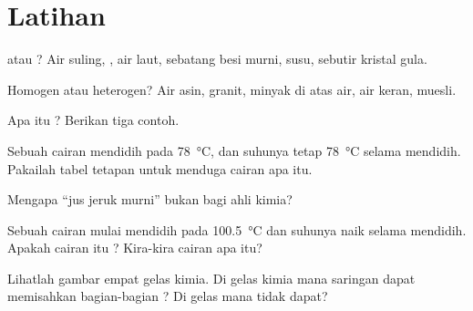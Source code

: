 \section{Latihan}

\begin{exercise}[$\star$]\label{exo:g6:pure-substances-and-mixtures:1}
 atau ? Air suling, , air laut, sebatang besi
murni, susu, sebutir kristal gula.
\end{exercise}

\begin{exercise}[$\star$]\label{exo:g6:pure-substances-and-mixtures:2}
Homogen atau heterogen? Air asin, granit, minyak di atas air, air
keran, muesli.
\end{exercise}

\begin{exercise}[$\star$]\label{exo:g6:pure-substances-and-mixtures:3}
Apa itu ? Berikan tiga contoh.
\end{exercise}

\begin{exercise}[$\star$]\label{exo:g6:pure-substances-and-mixtures:4}
Sebuah cairan mendidih pada \qty{78}{\celsius}, dan suhunya tetap
\qty{78}{\celsius} selama mendidih. Pakailah tabel tetapan untuk
menduga cairan apa itu.
\end{exercise}

\begin{exercise}[$\star$]\label{exo:g6:pure-substances-and-mixtures:5}
Mengapa ``jus jeruk murni'' bukan  bagi ahli kimia?
\end{exercise}

\begin{exercise}[$\star\star$]\label{exo:g6:pure-substances-and-mixtures:6}
Sebuah cairan mulai mendidih pada \qty{100.5}{\celsius} dan suhunya
naik selama mendidih. Apakah cairan itu ? Kira-kira cairan apa
itu?
\end{exercise}

\begin{exercise}[$\star\star$]\label{exo:g6:pure-substances-and-mixtures:7}
Lihatlah gambar empat gelas kimia. Di gelas kimia mana saringan dapat
memisahkan bagian-bagian ? Di gelas mana tidak dapat?
\end{exercise}


